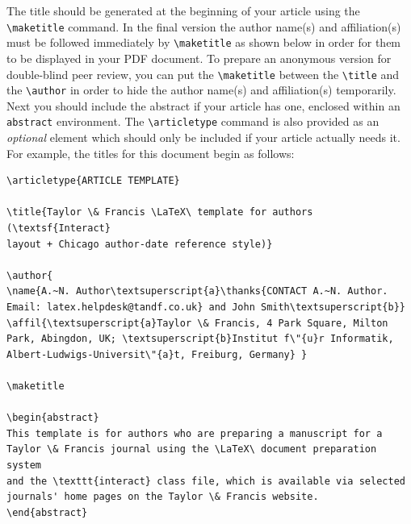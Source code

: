 \documentclass[]{interact}
\theoremstyle{plain}%
\theoremstyle{definition}
\theoremstyle{remark}
\begin{document}
The title should be generated at the beginning of your article using the \verb"\maketitle" command.
In the final version the author name(s) and affiliation(s) must be followed immediately by \verb"\maketitle" as shown below in order for them to be displayed in your PDF document.
To prepare an anonymous version for double-blind peer review, you can put the \verb"\maketitle" between the \verb"\title" and the \verb"\author" in order to hide the author name(s) and affiliation(s) temporarily.
Next you should include the abstract if your article has one, enclosed within an \texttt{abstract} environment.
The \verb"\articletype" command is also provided as an \emph{optional} element which should only be included if your article actually needs it.
For example, the titles for this document begin as follows:
\begin{verbatim}
\articletype{ARTICLE TEMPLATE}

\title{Taylor \& Francis \LaTeX\ template for authors (\textsf{Interact}
layout + Chicago author-date reference style)}

\author{
\name{A.~N. Author\textsuperscript{a}\thanks{CONTACT A.~N. Author.
Email: latex.helpdesk@tandf.co.uk} and John Smith\textsuperscript{b}}
\affil{\textsuperscript{a}Taylor \& Francis, 4 Park Square, Milton
Park, Abingdon, UK; \textsuperscript{b}Institut f\"{u}r Informatik,
Albert-Ludwigs-Universit\"{a}t, Freiburg, Germany} }

\maketitle

\begin{abstract}
This template is for authors who are preparing a manuscript for a
Taylor \& Francis journal using the \LaTeX\ document preparation system
and the \texttt{interact} class file, which is available via selected
journals' home pages on the Taylor \& Francis website.
\end{abstract}
\end{verbatim}
\end{document}
